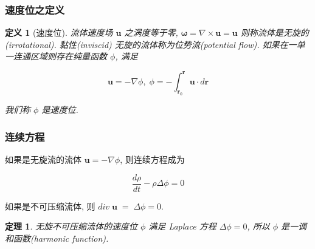 \documentclass[aspectratio=2516]{beamer}
\newtheorem{defi}{\kaishu 定义}
\newtheorem{thm}{\kaishu 定理}
\begin{document}
\begin{frame}
\frametitle{\kaishu 速度位之定义}

\kaishu 

\begin{defi}[\kaishu 速度位]
	
	\kaishu
	
	流体速度场 $ \boldsymbol{u} $ 之涡度等于零, $\boldsymbol{\omega} = \nabla  \times \boldsymbol{u} = \boldsymbol{u}$ 则称流体是无旋的(irrotational). 黏性(inviscid) 无旋的流体称为位势流(potential flow). 如果在一单一连通区域则存在纯量函数 $ \phi $, 满足
	
	\begin{equation}
	\boldsymbol{u} =  - \nabla \phi ,\;\phi  =  - \int_{{\boldsymbol{r}_0}}^{\boldsymbol{r}} {\boldsymbol{u} \cdot d\boldsymbol{r}} 
	\label{eq5.3.12}
	\end{equation}
	
	我们称 $ \phi $ 是速度位.
	\label{def5.3.3}
\end{defi}

\end{frame}


\begin{frame}
\frametitle{\kaishu 连续方程}

\kaishu

如果是无旋流的流体 $\boldsymbol{u} =  - \nabla \phi $, 则连续方程成为

\begin{equation}
\frac{{d\rho }}{{dt}} - \rho \Delta \phi  = 0
\label{eq5.3.13}
\end{equation}

\vspace{0.75cm}

如果是不可压缩流体, 则 $div\;\boldsymbol{u}\; = \;\Delta \phi  = 0$.

\begin{thm}
	\kaishu
	无旋不可压缩流体的速度位 $ \phi  $ 满足 Laplace 方程 $\Delta \phi  = 0$, 所以 $ \phi  $ 是一调和函数(harmonic function).
	\label{thm5.3.5}
\end{thm}
\end{frame}

\end{document}
